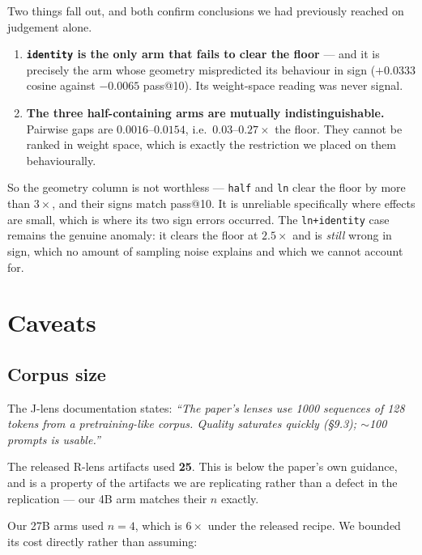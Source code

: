 \documentclass[11pt,a4paper]{article}
\newcommand{\jlens}{J\nobreakdash-lens}
\newcommand{\rlens}{R\nobreakdash-lens}
\newcommand{\cfg}[1]{\texttt{#1}}
\begin{document}
\noindent
Two things fall out, and both confirm conclusions we had previously reached on
judgement alone.

\begin{enumerate}[leftmargin=1.4em]
  \item \textbf{\cfg{identity} is the only arm that fails to clear the floor} --- and it
        is precisely the arm whose geometry mispredicted its behaviour in sign
        ($+0.0333$ cosine against $-0.0065$ pass@10). Its weight-space reading was
        never signal.
  \item \textbf{The three half-containing arms are mutually indistinguishable.}
        Pairwise gaps are $0.0016$--$0.0154$, i.e.\ $0.03$--$0.27\times$ the floor.
        They cannot be ranked in weight space, which is exactly the restriction we
        placed on them behaviourally.
\end{enumerate}

\noindent
So the geometry column is not worthless --- \cfg{half} and \cfg{ln} clear the floor by
more than $3\times$, and their signs match pass@10. It is unreliable specifically where
effects are small, which is where its two sign errors occurred. The
\cfg{ln+identity} case remains the genuine anomaly: it clears the floor at $2.5\times$
and is \emph{still} wrong in sign, which no amount of sampling noise explains and which
we cannot account for.

\section{Caveats}

\subsection{Corpus size}
\label{sec:corpus}

The \jlens{} documentation states: \emph{``The paper's lenses use 1000 sequences of
128 tokens from a pretraining-like corpus. Quality saturates quickly (\S9.3);
$\sim$100 prompts is usable.''}

The released \rlens{} artifacts used \textbf{25}. This is below the paper's own
guidance, and is a property of the artifacts we are replicating rather than a defect
in the replication --- our 4B arm matches their $n$ exactly.

Our 27B arms used $n=4$, which is $6\times$ under the released recipe. We bounded its
cost directly rather than assuming:
\end{document}
